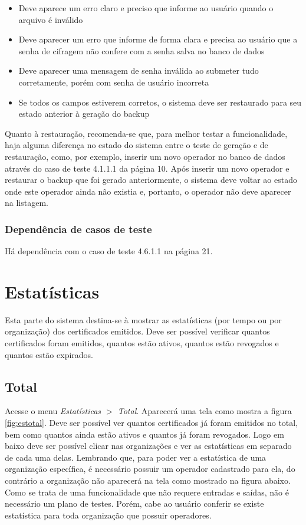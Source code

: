 \begin{itemize}

	\item Deve aparece um erro claro e preciso que informe ao usuário quando o arquivo é inválido
	\item Deve aparecer um erro que informe de forma clara e precisa ao usuário que a senha de cifragem não confere com a senha salva no banco de dados
	\item Deve aparecer uma mensagem de senha inválida ao submeter tudo corretamente, porém com senha de usuário incorreta
	\item Se todos os campos estiverem corretos, o sistema deve ser restaurado para seu estado anterior à geração do backup
	
\end{itemize}

Quanto à restauração, recomenda-se que, para melhor testar a funcionalidade, haja alguma diferença no estado do sistema entre o teste de geração e de restauração, como, por exemplo, inserir um novo operador no banco de dados através do caso de teste 4.1.1.1 da página 10. Após inserir um novo operador e restaurar o backup que foi gerado anteriormente, o sistema deve voltar ao estado onde este operador ainda não existia e, portanto, o operador não deve aparecer na listagem.

\subsubsection{Dependência de casos de teste}
Há dependência com o caso de teste 4.6.1.1 na página 21.

\section{Estatísticas}

Esta parte do sistema destina-se à mostrar as estatísticas (por tempo ou por organização) dos certificados emitidos. Deve ser possível verificar quantos certificados foram emitidos, quantos estão ativos, quantos estão revogados e quantos estão expirados.

\subsection{Total}

Acesse o menu \textit{Estatísticas $>$ Total}. Aparecerá uma tela como mostra a figura \ref{fig:estotal}. Deve ser possível ver quantos certificados já foram emitidos no total, bem como quantos ainda estão ativos e quantos já foram revogados. Logo em baixo deve ser possível clicar nas organizações e ver as estatísticas em separado de cada uma delas. Lembrando que, para poder ver a estatística de uma organização específica, é necessário possuir um operador cadastrado para ela, do contrário a organização não aparecerá na tela como mostrado na figura abaixo. Como se trata de uma funcionalidade que não requere entradas e saídas, não é necessário um plano de testes. Porém, cabe ao usuário conferir se existe estatística para toda organização que possuir operadores.

